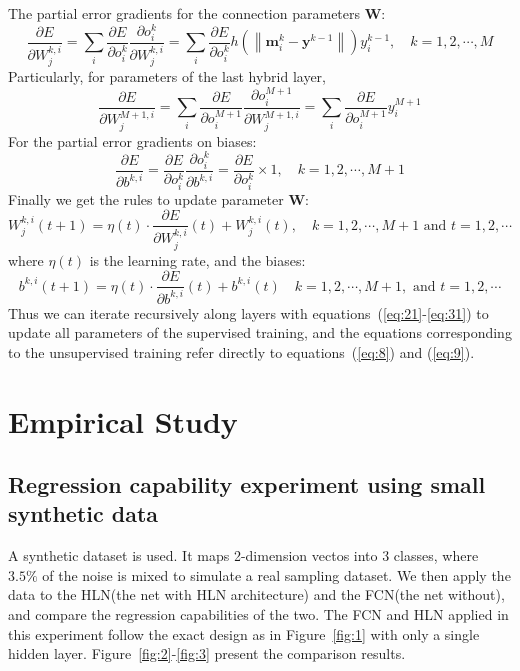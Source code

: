 \documentclass[3p,times,procedia]{elsarticle}
\begin{document}
The partial error gradients for the
connection parameters $\mathbf{W}$:
\begin{equation}
	\frac{\partial E}
	{\partial W_j^{k,i}}=\sum_i
	\frac{\partial E}
	{\partial o_i^k}
	\frac{\partial o_i^k}
	{\partial W_j^{k,i}}=\sum_i
	\frac{\partial E}
	{\partial o_i^k}
	h\left(
	\left\|
	\mathbf{m}_i^k-
	\mathbf{y}^{k-1}
	\right\|
	\right)
	y_i^{k-1},
	\quad k=1,2,\cdots,M
	\label{eq:27}
\end{equation}
Particularly, for parameters of the last 
hybrid layer,
\begin{equation}
	\frac{\partial E}
	{\partial W_j^{M+1,i}}=\sum_i
	\frac{\partial E}
	{\partial o_i^{M+1}}
	\frac{\partial o_i^{M+1}}
	{\partial W_j^{M+1,i}}=\sum_i
	\frac{\partial E}
	{\partial o_i^{M+1}}
	y_i^{M+1}
	\label{eq:28}
\end{equation}
For the partial error gradients on biases:
\begin{equation}
	\frac{\partial E}
	{\partial b^{k,i}}=
	\frac{\partial E}
	{\partial o_i^k}
	\frac{\partial o_i^k}
	{\partial b^{k,i}}=
	\frac{\partial E}
	{\partial o_i^k}
	\times 1,
	\quad k=1,2,\cdots,M+1
	\label{eq:29}
\end{equation}
Finally we get the rules to update parameter
$\mathbf{W}$:
\begin{equation}
	W_j^{k,i}(t+1) = \eta(t)\cdot
	\frac{\partial E}{\partial W_j^{k,i}}(t)+
	W_j^{k,i}(t),
	\quad k=1,2,\cdots,M+1
	\text{ and }
	t=1,2,\cdots
	\label{eq:30}
\end{equation}
where $\eta(t)$ is the learning rate, and 
the biases:
\begin{equation}
	b^{k,i}(t+1) = \eta(t)\cdot
	\frac{\partial E}{\partial b^{k,i}}(t)+
	b^{k,i}(t)
	\quad k=1,2,\cdots,M+1,
	\text{ and }
	t=1,2,\cdots
	\label{eq:31}
\end{equation}
Thus we can iterate recursively along 
layers with 
equations~(\ref{eq:21}-\ref{eq:31}) to 
update all parameters of the supervised 
training, and the equations corresponding 
to the unsupervised training refer 
directly to equations~(\ref{eq:8}) and 
(\ref{eq:9}).

\section{Empirical Study}
\subsection{Regression capability
experiment using small synthetic data}
A synthetic dataset is used. It maps
2-dimension vectos into 3 classes, where
$3.5\%$ of the noise is mixed to simulate 
a real sampling dataset.
We then apply the data to the HLN(the 
net with HLN architecture) and the 
FCN(the net without),
and compare the regression capabilities 
of the two. 
The FCN and HLN applied in this 
experiment follow the exact design as 
in Figure~\ref{fig:1} with only a single 
hidden layer.
Figure~\ref{fig:2}-\ref{fig:3} 
present the comparison results.
\end{document}
